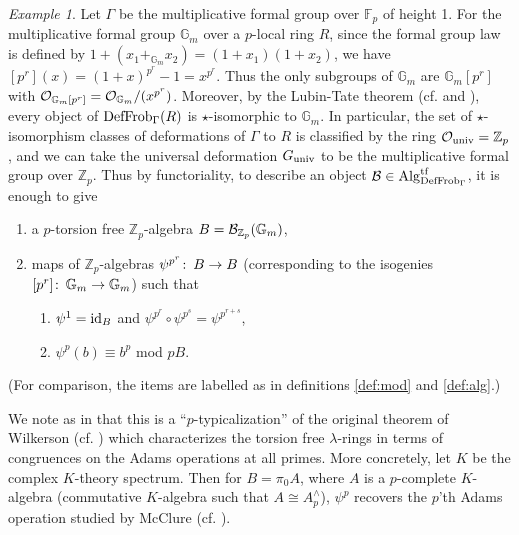 \documentclass{gtpart}
\theoremstyle{definition}
\theoremstyle{remark}
\newtheorem{exam}[thm]{Example}
\def\co{\colon\thinspace}
\newcommand{\mb}[1]{\mathbb{#1}}
\newcommand{\Alg}{{\rm Alg}}
\newcommand{\CO}{{\cal O}}
\newcommand{\DF}{{{\rm DefFrob}_\Gamma}}
\newcommand{\Gm}{{{\mb G}_m}}
\begin{document}
\begin{exam}
\label{ex:K}
Let $\Gamma$ be the multiplicative formal group over ${\mb F}_p$ 
of height 1.  For the multiplicative formal group $\Gm$ over a 
$p$-local ring $R$, since the formal group law is defined by 
$1 + (x_1 +_\Gm x_2) = (1 + x_1)(1 + x_2)$, we have 
$[p^r](x) = (1 + x)^{p^r} - 1 = x^{p^r}$.  Thus the only subgroups 
of $\Gm$ are $\Gm [p^r]$ with $\CO_{\Gm [p^r]} = \CO_\Gm / (x^{p^r})$.  
Moreover, by the Lubin-Tate theorem (cf. \cite[theorem 3.1]{lubintate} and \cite[section 4.3]{H-Mthm}), every object of $\DF(R)$ is 
$\star$-isomorphic to $\Gm$.  In particular, the set of 
$\star$-isomorphism classes of deformations of $\Gamma$ to $R$ 
is classified by the ring $\CO_{\rm univ} = {\mb Z}_p$, and we 
can take the universal deformation $G_{\rm univ}$ to be the 
multiplicative formal group over ${\mb Z}_p$.  Thus by functoriality, 
to describe an object ${\cal B} \in \Alg_\DF^{\rm tf}$, it is enough to give
\begin{enumerate}
\item a $p$-torsion free ${\mb Z}_p$-algebra $B = {\cal B}_{{\mb Z}_p}(\Gm)$, 
\item maps of ${\mb Z}_p$-algebras $\psi^{p^r}\co B \to B$ 
(corresponding to the isogenies $[p^r]\co \Gm \to \Gm$) such that 
\begin{enumerate}
 \item $\psi^1 = {\rm id}_B$ and $\psi^{p^r} \circ \psi^{p^s} = 
\psi^{p^{r+s}}$,
 \item $\psi^p(b) \equiv b^p$ mod $pB$.
\end{enumerate}
\end{enumerate}
(For comparison, the items are labelled as in definitions \ref{def:mod} and \ref{def:alg}.)  

We note as in \cite[example 1.3]{cong} that this is a 
``$p$-typicalization'' of the original theorem of Wilkerson 
(cf. \cite[proposition 1.2]{wilkerson}) which characterizes the torsion free $\lambda$-rings 
in terms of congruences on the Adams operations at all primes.  
More concretely, let $K$ be the complex $K$-theory spectrum.  Then for 
$B = \pi_0 A$, where $A$ is a $p$-complete $K$-algebra (commutative 
$K$-algebra such that $A \cong A_p^\wedge$), $\psi^p$ recovers the $p$'th 
Adams operation studied by McClure (cf. \cite[chapters VIII and IX]{BMSS}).  
\end{exam}
\end{document}
